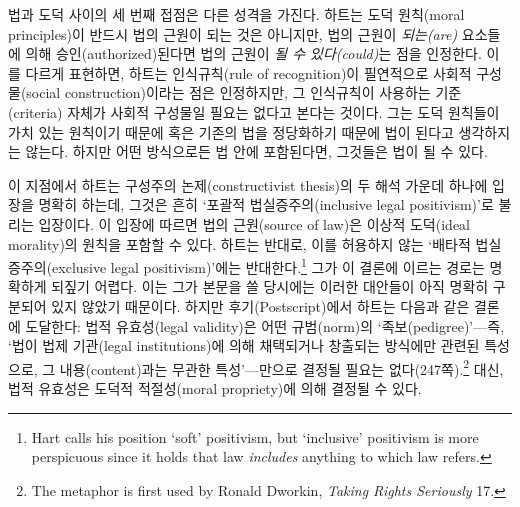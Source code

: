 \documentclass[12pt, oneside]{book}  %
\begin{document}
법과 도덕 사이의 세 번째 접점은 다른 성격을 가진다. 하트는 도덕
원칙(moral principles)이 반드시 법의 근원이 되는 것은 아니지만, 법의
근원이 \emph{되는(are)} 요소들에 의해 승인(authorized)된다면 법의 근원이
\emph{될 수 있다(could)}는 점을 인정한다. 이를 다르게 표현하면, 하트는
인식규칙(rule of recognition)이 필연적으로 사회적 구성물(social
construction)이라는 점은 인정하지만, 그 인식규칙이 사용하는
기준(criteria) 자체가 사회적 구성물일 필요는 없다고 본다는 것이다. 그는
도덕 원칙들이 가치 있는 원칙이기 때문에 혹은 기존의 법을 정당화하기
때문에 법이 된다고 생각하지는 않는다. 하지만 어떤 방식으로든 법 안에
포함된다면, 그것들은 법이 될 수 있다.

이 지점에서 하트는 구성주의 논제(constructivist thesis)의 두 해석 가운데
하나에 입장을 명확히 하는데, 그것은 흔히 `포괄적 법실증주의(inclusive
legal positivism)'로 불리는 입장이다. 이 입장에 따르면 법의 근원(source
of law)은 이상적 도덕(ideal morality)의 원칙을 포함할 수 있다. 하트는
반대로, 이를 허용하지 않는 `배타적 법실증주의(exclusive legal
positivism)'에는 반대한다.\footnote{Hart calls his position `soft'
  positivism, but `inclusive' positivism is more perspicuous since it
  holds that law \emph{includes} anything to which law refers.} 그가 이
결론에 이르는 경로는 명확하게 되짚기 어렵다. 이는 그가 본문을 쓸
당시에는 이러한 대안들이 아직 명확히 구분되어 있지 않았기 때문이다.
하지만 후기(Postscript)에서 하트는 다음과 같은 결론에 도달한다: 법적
유효성(legal validity)은 어떤 규범(norm)의 `족보(pedigree)'---즉, `법이
법제 기관(legal institutions)에 의해 채택되거나 창출되는 방식에만 관련된
특성으로, 그 내용(content)과는 무관한 특성'---만으로 결정될 필요는
없다(247쪽).\footnote{The metaphor is first used by Ronald Dworkin,
  \emph{Taking Rights Seriously} 17.} 대신, 법적 유효성은 도덕적
적절성(moral propriety)에 의해 결정될 수 있다.
\end{document}
